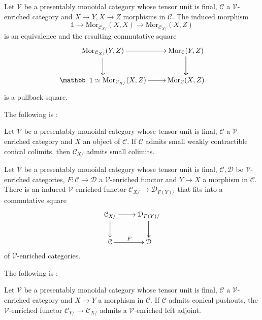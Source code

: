 \documentclass[10pt,oneside]{article}
\numberwithin{equation}{section} %
\numberwithin{figure}{section} %
\theoremstyle{plain}
\theoremstyle{definition}
\newcommand{\mC}{{\mathcal C}}
\newcommand{\mD}{{\mathcal D}}
\newcommand{\mV}{{\mathcal V}}
\newcommand{\X}{X}
\newcommand{\Y}{Y}
\newcommand{\Z}{Z}
\newcommand{\tu}{{\mathbb 1}}
\newcommand{\Mor}{{\mathrm{Mor}}}
\begin{document}
\begin{remark}\label{init}
Let $\mV$ be a presentably monoidal category whose tensor unit is final, $\mC$ a $\mV$-enriched category and $\X \to \Y, \X \to \Z$ morphisms in $\mC.$
The induced morphism $$\tu \to \Mor_{\mC_{\X/}}(\X,\X) \to \Mor_{\mC_{\X/}}(\X,\Z)$$ is an equivalence and the resulting commutative square
$$\begin{xy}
\xymatrix{
\Mor_{\mC_{\X/}}(\Y,\Z) \ar[d]^{} \ar[r]
& \Mor_{\mC}(\Y,\Z) \ar[d] \ar[d]^{}
\\ 
\tu \simeq \Mor_{\mC_{\X/}}(\X,\Z) \ar[r] & \Mor_{\mC}(\X,\Z)
}
\end{xy}$$
is a pullback square.
    
\end{remark}

The following is \cite[Lemma 2.2.3]{oriented}:

\begin{lemma}

Let $\mV$ be a presentably monoidal category whose tensor unit is final, $\mC$ a $\mV$-enriched category and $X $ an object of $\mC.$
If $\mC$ admits small weakly contractible conical colimits, then $\mC_{\X/}$ admits small colimits.

\end{lemma}

\begin{remark}
Let $\mV$ be a presentably monoidal category whose tensor unit is final, $\mC, \mD$ be $\mV$-enriched categories, $F: \mC \to \mD$ a $\mV$-enriched functor 
and $Y \to X $ a morphism in $\mC.$
There is an induced $\mV$-enriched functor 
$\mC_{\X/} \to \mD_{F(\Y)/}$ that fits into a commutative square 
$$\begin{xy}
\xymatrix{
\mC_{\X/} \ar[d]^{} \ar[r]
&  \mD_{F(\Y)/} \ar[d] \ar[d]^{}
\\ 
\mC
\ar[r]^F & \mD
}
\end{xy}$$	
of $\mV$-enriched categories.
    
\end{remark}

The following is \cite[Lemma 2.2.5]{oriented}:

\begin{lemma}\label{bien}
Let $\mV$ be a presentably monoidal category whose tensor unit is final, $\mC$ a $\mV$-enriched category and $X \to Y$ a morphism in $\mC.$
If $\mC$ admits conical pushouts, the $\mV$-enriched functor $\mC_{\Y/} \to \mC_{\X/}$ admits a $\mV$-enriched left adjoint.
	
\end{lemma}
\end{document}
